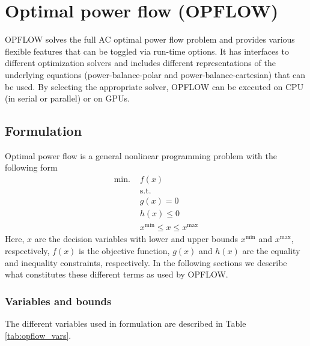 \chapter{Optimal power flow (OPFLOW)}\label{chap:opflow}

OPFLOW solves the full AC optimal power flow problem and provides various flexible features that can be toggled via run-time options. It has interfaces to different optimization solvers and includes different representations of the underlying equations (power-balance-polar and power-balance-cartesian) that can be used. By selecting the appropriate solver, OPFLOW can be executed on CPU (in serial or parallel) or on GPUs.

\section{Formulation}
Optimal power flow is a general nonlinear programming problem with the following form
\begin{align}
\text{min. }& f(x) \\
&\text{s.t.} \nonumber \\
& g(x) = 0 \\
& h(x) \le 0 \\
& x^{\text{min}} \le x \le x^{\text{max}}
\end{align}
Here, $x$ are the decision variables with lower and upper bounds $x^{\text{min}}$ and $x^{\text{max}}$, respectively, $f(x)$ is the objective function, $g(x)$ and $h(x)$ are the equality and inequality constraints, respectively. In the following sections we describe what constitutes these different terms as used by OPFLOW.

\subsection{Variables and bounds} \label{subsec:opflow_var}

The different variables used in \opflow formulation are described in Table \ref{tab:opflow_vars}.

